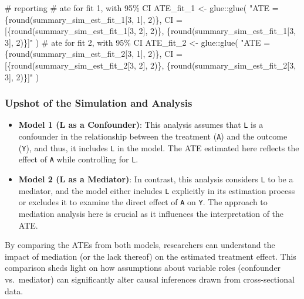 \documentclass[
  singlecolumn]{article}
\newenvironment{Shaded}{}{}
\newcommand{\CommentTok}[1]{\textcolor[rgb]{0.42,0.45,0.49}{#1}}
\newcommand{\FunctionTok}[1]{\textcolor[rgb]{0.44,0.26,0.76}{#1}}
\newcommand{\NormalTok}[1]{\textcolor[rgb]{0.14,0.16,0.18}{#1}}
\newcommand{\OtherTok}[1]{\textcolor[rgb]{0.44,0.26,0.76}{#1}}
\newcommand{\SpecialCharTok}[1]{\textcolor[rgb]{0.00,0.36,0.77}{#1}}
\newcommand{\StringTok}[1]{\textcolor[rgb]{0.01,0.18,0.38}{#1}}
\begin{document}
\begin{Shaded}
\begin{Highlighting}[]
\CommentTok{\# reporting }
\CommentTok{\# ate for fit 1, with 95\% CI}
\NormalTok{ATE\_fit\_1 }\OtherTok{\textless{}{-}}\NormalTok{ glue}\SpecialCharTok{::}\FunctionTok{glue}\NormalTok{(}
  \StringTok{"ATE =}
\StringTok{                        \{round(summary\_sim\_est\_fit\_1[3, 1], 2)\},}
\StringTok{                        CI = [\{round(summary\_sim\_est\_fit\_1[3, 2], 2)\},}
\StringTok{                        \{round(summary\_sim\_est\_fit\_1[3, 3], 2)\}]"}
\NormalTok{)}
\CommentTok{\# ate for fit 2, with 95\% CI}
\NormalTok{ATE\_fit\_2 }\OtherTok{\textless{}{-}}
\NormalTok{  glue}\SpecialCharTok{::}\FunctionTok{glue}\NormalTok{(}
    \StringTok{"ATE = \{round(summary\_sim\_est\_fit\_2[3, 1], 2)\},}
\StringTok{                        CI = [\{round(summary\_sim\_est\_fit\_2[3, 2], 2)\},}
\StringTok{                        \{round(summary\_sim\_est\_fit\_2[3, 3], 2)\}]"}
\NormalTok{  )}
\end{Highlighting}
\end{Shaded}

\subsubsection{Upshot of the Simulation and
Analysis}\label{upshot-of-the-simulation-and-analysis}

\begin{itemize}
\item
  \textbf{Model 1 (L as a Confounder)}: This analysis assumes that
  \texttt{L} is a confounder in the relationship between the treatment
  (\texttt{A}) and the outcome (\texttt{Y}), and thus, it includes
  \texttt{L} in the model. The ATE estimated here reflects the effect of
  \texttt{A} while controlling for \texttt{L}.
\item
  \textbf{Model 2 (L as a Mediator)}: In contrast, this analysis
  considers \texttt{L} to be a mediator, and the model either includes
  \texttt{L} explicitly in its estimation process or excludes it to
  examine the direct effect of \texttt{A} on \texttt{Y}. The approach to
  mediation analysis here is crucial as it influences the interpretation
  of the ATE.
\end{itemize}

By comparing the ATEs from both models, researchers can understand the
impact of mediation (or the lack thereof) on the estimated treatment
effect. This comparison sheds light on how assumptions about variable
roles (confounder vs.~mediator) can significantly alter causal
inferences drawn from cross-sectional data.
\end{document}
